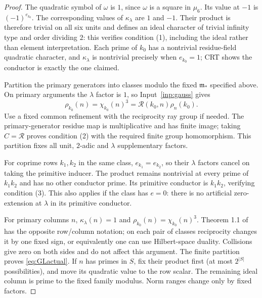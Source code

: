 \documentclass[11pt,a4paper]{article}
\numberwithin{equation}{section}
\theoremstyle{definition}
\theoremstyle{remark}
\begin{document}
\begin{proof}
The quadratic symbol of $\omega$ is $1$, since $\omega$ is a square in $\mu_6$. Its value at $-1$ is $(-1)^{e_{k_0}}$. The corresponding values of $\kappa_\lambda$ are $1$ and $-1$. Their product is therefore trivial on all six units and defines an ideal character of trivial infinity type and order dividing $2$: this verifies condition (1), including the ideal rather than element interpretation. Each prime of $k_0$ has a nontrivial residue-field quadratic character, and $\kappa_\lambda$ is nontrivial precisely when $e_{k_0}=1$; CRT shows the conductor is exactly the one claimed.

Partition the primary generators into classes modulo the fixed $\mathfrak m_*$ specified above. On primary arguments the $\lambda$ factor is $1$, so Input~\ref{inp:gauss} gives
\[
 \rho_{k_0}(n)=\chi_{k_0}(n)^3=\mathcal R(k_0,n)\rho_n(k_0).
\]
Use a fixed common refinement with the reciprocity ray group if needed. The primary-generator residue map is multiplicative and has finite image; taking $C=\mathcal R$ proves condition (2) with the required finite group homomorphism. This partition fixes all unit, $2$-adic and $\lambda$ supplementary factors.

For coprime rows $k_1,k_2$ in the same class, $e_{k_1}=e_{k_2}$, so their $\lambda$ factors cancel on taking the primitive inducer. The product remains nontrivial at every prime of $k_1k_2$ and has no other conductor prime. Its primitive conductor is $k_1k_2$, verifying condition (3). This also applies if the class has $e=0$: there is no artificial zero-extension at $\lambda$ in its primitive conductor.

For primary columns $n$, $\kappa_\lambda(n)=1$ and $\rho_{k_0}(n)=\chi_{k_0}(n)^3$. Theorem 1.1 of \cite{GL} has the opposite row/column notation; on each pair of classes reciprocity changes it by one fixed sign, or equivalently one can use Hilbert-space duality. Collisions give zero on both sides and do not affect this argument. The finite partition proves \eqref{eq:GLactual}. If $n$ has primes in $S$, fix their product first (at most $2^{|S|}$ possibilities), and move its quadratic value to the row scalar. The remaining ideal column is prime to the fixed family modulus. Norm ranges change only by fixed factors.
\end{proof}
\end{document}

